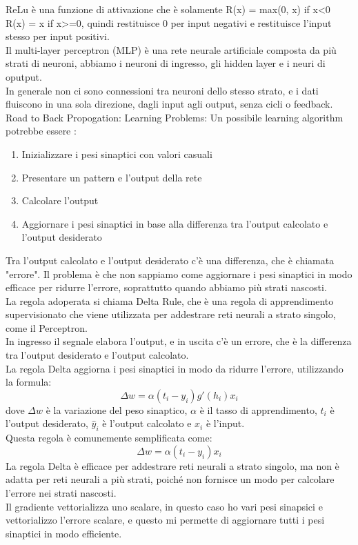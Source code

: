 ReLu è una funzione di attivazione che è solamente R(x) = max(0, x) if x<0 R(x) = x if x>=0, quindi restituisce 0 per input negativi 
e restituisce l'input stesso per input positivi.\\

Il multi-layer perceptron (MLP) è una rete neurale artificiale composta da più strati di neuroni, abbiamo i neuroni di ingresso, gli hidden layer e i neuri di oputput.\\
In generale non ci sono connessioni tra neuroni dello stesso strato, e i dati fluiscono in una sola direzione, dagli input agli output, senza cicli o feedback.\\

Road to Back Propogation: Learning Problems: 
Un possibile learning algorithm potrebbe essere : 
\begin{enumerate}
    \item Inizializzare i pesi sinaptici con valori casuali
    \item Presentare un pattern e l'output della rete
    \item Calcolare l'output
    \item Aggiornare i pesi sinaptici in base alla differenza tra l'output calcolato e l'output desiderato
\end{enumerate}

Tra l'output calcolato e l'output desiderato c'è una differenza, che è chiamata "errore".
Il problema è che non sappiamo come aggiornare i pesi sinaptici in modo efficace per ridurre l'errore, soprattutto quando abbiamo più strati nascosti.\\

La regola adoperata si chiama Delta Rule, che è una regola di apprendimento supervisionato che viene utilizzata per addestrare reti neurali a strato singolo, 
come il Perceptron.\\
In ingresso il segnale elabora l'output, e in uscita c'è un errore, che è la differenza tra l'output desiderato e l'output calcolato.\\
La regola Delta aggiorna i pesi sinaptici in modo da ridurre l'errore, utilizzando la formula: 
$$\Delta w = \alpha (t_i-y_i)g'(h_i) x_i$$
dove $\Delta w$ è la variazione del peso sinaptico, $\alpha$ è il tasso di apprendimento, $t_i$ è l'output desiderato, $\hat{y}_i$ è l'output calcolato e $x_i$ è l'input.\\
 Questa regola è comunemente semplificata come:
$$\Delta w = \alpha (t_i-y_i) x_i$$
La regola Delta è efficace per addestrare reti neurali a strato singolo, ma non è adatta per reti neurali a più strati, poiché non fornisce
un modo per calcolare l'errore nei strati nascosti.\\
Il gradiente vettorializza uno scalare, in questo caso ho vari pesi sinapsici e vettorializzo l'errore scalare, e questo mi permette di aggiornare 
tutti i pesi sinaptici in modo efficiente.\\

